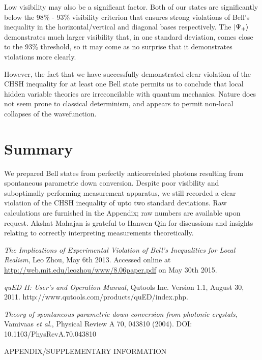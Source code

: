 \documentclass[aps,prl,nofootinbib,twocolumn,superscriptaddress,groupedaddress]{revtex4}  %
\begin{document}
Low visibility may also be a significant factor. Both of our states are significantly below the 98\% - 93\% visibility criterion that ensures strong violations of Bell's inequality in the horizontal/vertical and diagonal bases respectively. The $\ket{\Psi_{+}}$ demonstrates much larger visibility that, in one standard deviation, comes close to the 93\% threshold, so it may come as no surprise that it demonstrates violations more clearly. 

However, the fact that we have successfully demonstrated clear violation of the CHSH inequality for at least one Bell state permits us to conclude that local hidden variable theories are irreconcilable with quantum mechanics. Nature does not seem prone to classical determinism, and appears to permit non-local collapses of the wavefunction.
\section{Summary}
We prepared Bell states from perfectly anticorrelated photons resulting from spontaneous parametric down conversion. Despite poor visibility and suboptimally performing measurement apparatus, we still recorded a clear violation of the CHSH inequality of upto two standard deviations. Raw calculations are furnished in the Appendix; raw numbers are available upon request. Akshat Mahajan is grateful to Hanwen Qin for discussions and insights relating to correctly interpreting measurements theoretically.
\begin{thebibliography}{1}

   \textit{The Implications of Experimental Violation of Bell's Inequalities for Local Realism}, Leo Zhou, May 6th 2013. Accessed online at \url{http://web.mit.edu/leozhou/www/8.06paper.pdf} on May 30th 2015. 

   \textit{quED II: User's and Operation Manual}, Qutools Inc. Version 1.1, August 30, 2011. http://www.qutools.com/products/quED/index.php.
   
   \textit{Theory of spontaneous parametric down-conversion from photonic crystals}, Vamivaas \textit{et al.}, Physical Review A 70, 043810 (2004). DOI: 10.1103/PhysRevA.70.043810
\end{thebibliography}

\clearpage
\newpage
\appendix
\onecolumngrid
\begin{Large}
\begin{center}
APPENDIX/SUPPLEMENTARY INFORMATION
\end{center}
\end{Large}
\end{document}

